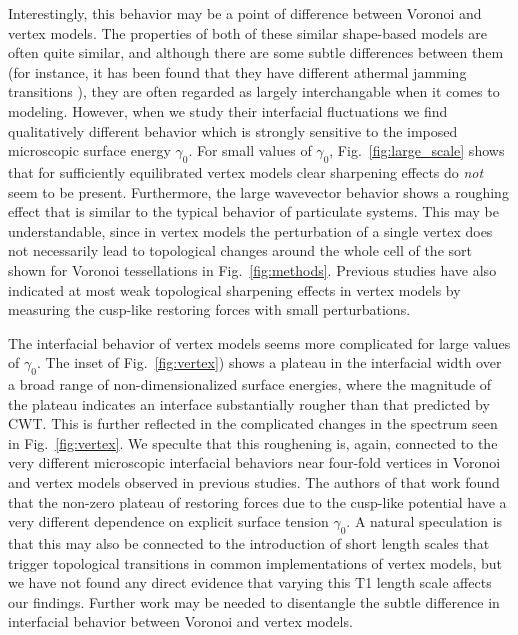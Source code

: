 \documentclass[twoside,twocolumn,9pt]{article}
\begin{document}
Interestingly, this behavior may be a point of difference between Voronoi and vertex models. The properties of both of these similar shape-based models are often quite similar, and although there are some subtle differences between them (for instance, it has been found that they have different athermal jamming transitions \cite{sussman2018no}), they are often regarded as largely interchangable when it comes to modeling. However, when we study their interfacial fluctuations we find qualitatively different behavior which is strongly sensitive to the imposed microscopic surface energy $\gamma_0$. For small values of $\gamma_0$, Fig.~\ref{fig:large_scale} shows that for sufficiently equilibrated vertex models clear sharpening effects do \emph{not} seem to be present. Furthermore, the large wavevector behavior shows a roughing effect that is similar to the typical behavior of particulate systems. This may be understandable, since in vertex models the perturbation of a single vertex does not  necessarily lead to topological changes around the whole cell of the sort shown for Voronoi tessellations in Fig.~\ref{fig:methods}. Previous studies have also indicated at most weak topological sharpening effects in vertex models by measuring the cusp-like restoring forces with small perturbations\cite{lawson2024differences}. 

The interfacial behavior of vertex models seems more complicated for large values of $\gamma_0$. The inset of Fig.~\ref{fig:vertex}) shows  a plateau in the interfacial width over a broad range of non-dimensionalized surface energies, where the magnitude of the plateau indicates an interface substantially rougher than that predicted by CWT. This is further reflected in the complicated changes in the spectrum seen in Fig.~\ref{fig:vertex}. We speculte that this roughening is, again, connected to the very different microscopic interfacial behaviors near four-fold vertices in Voronoi and vertex models observed in previous studies\cite{lawson2024differences}. The authors of that work found that the non-zero plateau of restoring forces due to the cusp-like potential have a very different dependence on explicit surface tension $\gamma_0$. A natural speculation is that this may also be connected to the introduction of short length scales that trigger topological transitions in common implementations of vertex models, but we have not found any direct evidence that varying this T1 length scale affects our findings. Further work may be needed to disentangle the subtle difference in interfacial behavior between Voronoi and vertex models.
\end{document}

